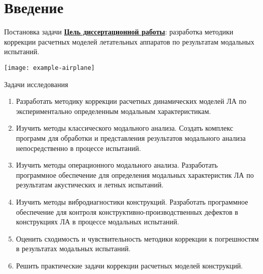 
\begin{frame}
    \setcounter{framenumber}{1}
    \maketitle
\end{frame}

\section{Введение}

\begin{frame}{Постановка задачи}
	\textbf{\underline{Цель диссертационной работы}}: разработка методики коррекции расчетных моделей летательных аппаратов по результатам модальных испытаний.
	\begin{center}
		\texttt{[image: example-airplane]}
	\end{center}
\end{frame}

\begin{frame}{Задачи исследования}
	\begin{enumerate}
		\item Разработать методику коррекции расчетных динамических моделей ЛА по экспериментально определенным модальным характеристикам.
		\item Изучить методы классического модального анализа. Создать комплекс программ для обработки и представления результатов модального анализа непосредственно в процессе испытаний.
		\item Изучить методы операционного модального анализа. Разработать программное обеспечение для определения модальных характеристик ЛА по результатам акустических и летных испытаний.
		\item Изучить методы вибродиагностики конструкций. Разработать программное обеспечение для контроля конструктивно-производственных дефектов в конструкциях ЛА в процессе модальных испытаний.
		\item Оценить сходимость и чувствительность методики коррекции к погрешностям в результатах модальных испытаний.
		\item Решить практические задачи коррекции расчетных моделей конструкций.
	\end{enumerate}
\end{frame}

